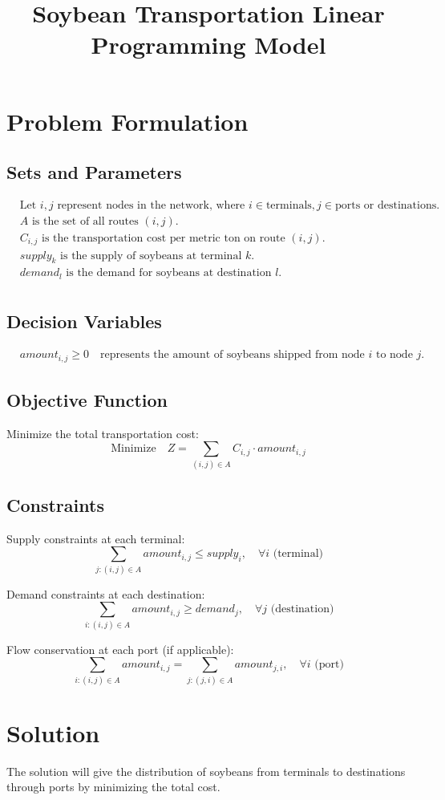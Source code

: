\documentclass{article}
\begin{document}
\title{Soybean Transportation Linear Programming Model}
\author{}
\date{}
\maketitle

\section{Problem Formulation}

\subsection{Sets and Parameters}
\begin{align*}
    &\text{Let } i, j \text{ represent nodes in the network, where } i \in \text{terminals}, j \in \text{ports or destinations}. \\
    &A \text{ is the set of all routes } (i, j). \\
    &C_{i,j} \text{ is the transportation cost per metric ton on route } (i, j). \\
    &supply_k \text{ is the supply of soybeans at terminal } k. \\
    &demand_l \text{ is the demand for soybeans at destination } l. \\
\end{align*}

\subsection{Decision Variables}
\begin{align*}
    &amount_{i,j} \geq 0 \quad \text{represents the amount of soybeans shipped from node } i \text{ to node } j.
\end{align*}

\subsection{Objective Function}

Minimize the total transportation cost:
\[
\text{Minimize} \quad Z = \sum_{(i,j) \in A} C_{i,j} \cdot amount_{i,j}
\]

\subsection{Constraints}

Supply constraints at each terminal:
\[
\sum_{j: (i,j) \in A} amount_{i,j} \leq supply_i, \quad \forall i \text{ (terminal)}
\]

Demand constraints at each destination:
\[
\sum_{i: (i,j) \in A} amount_{i,j} \geq demand_j, \quad \forall j \text{ (destination)}
\]

Flow conservation at each port (if applicable):
\[
\sum_{i: (i,j) \in A} amount_{i,j} = \sum_{j: (j,i) \in A} amount_{j,i}, \quad \forall i \text{ (port)}
\]

\section{Solution}
The solution will give the distribution of soybeans from terminals to destinations through ports by minimizing the total cost.
\end{document}
